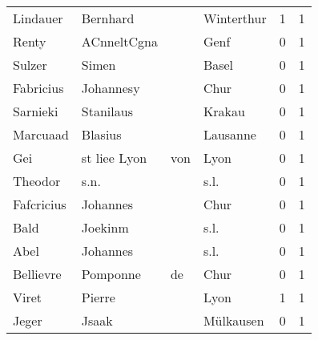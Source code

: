 \documentclass[10pt,a4paper,landscape]{article}
\begin{document}
\begin{longtable}{llllrr}
                 Lindauer &                           Bernhard &             &                                  Winterthur &          1 &         1 \\
                    Renty &                        ACnneltCgna &             &                                        Genf &          0 &         1 \\
                   Sulzer &                              Simen &             &                                       Basel &          0 &         1 \\
                Fabricius &                          Johannesy &             &                                        Chur &          0 &         1 \\
                 Sarnieki &                          Stanilaus &             &                                      Krakau &          0 &         1 \\
                 Marcuaad &                            Blasius &             &                                    Lausanne &          0 &         1 \\
                      Gei &                      st liee  Lyon &         von &                                        Lyon &          0 &         1 \\
                  Theodor &                               s.n. &             &                                        s.l. &          0 &         1 \\
               Fafcricius &                           Johannes &             &                                        Chur &          0 &         1 \\
                     Bald &                            Joekinm &             &                                        s.l. &          0 &         1 \\
                     Abel &                           Johannes &             &                                        s.l. &          0 &         1 \\
                Bellievre &                           Pomponne &          de &                                        Chur &          0 &         1 \\
                    Viret &                             Pierre &             &                                        Lyon &          1 &         1 \\
                    Jeger &                              Jsaak &             &                                   Mülkausen &          0 &         1 \\

\end{longtable}
\end{document}
